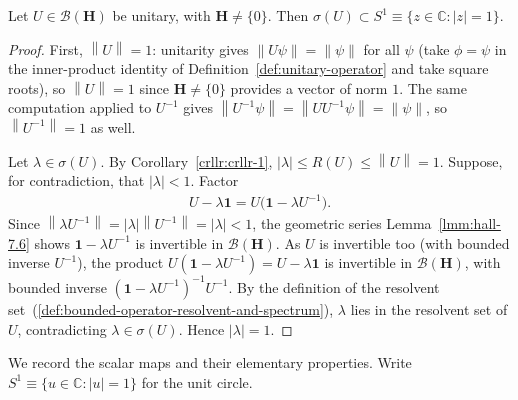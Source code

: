 \begin{lemma}
    \label{lmm:unitary-spectrum-circle}
    \leanok
    Let $U \in \mathcal{B}(\mathbf{H})$ be unitary, with $\mathbf{H} \ne \{0\}$. Then $\sigma(U) \subset S^1 \equiv \{ z \in \mathbb{C} : \lvert z \rvert = 1 \}$.
\end{lemma}
\begin{proof}
    \leanok
First, $\left\| U \right\| = 1$: unitarity gives $\left\| U\psi \right\| = \left\| \psi \right\|$ for all $\psi$ (take $\phi = \psi$ in the inner-product identity of Definition~\ref{def:unitary-operator} and take square roots), so $\left\| U \right\| = 1$ since $\mathbf{H} \ne \{0\}$ provides a vector of norm $1$. The same computation applied to $U^{-1}$ gives $\left\| U^{-1}\psi \right\| = \left\| U U^{-1}\psi \right\| = \left\| \psi \right\|$, so $\left\| U^{-1} \right\| = 1$ as well.

Let $\lambda \in \sigma(U)$. By Corollary~\ref{crllr:crllr-1}, $\lvert \lambda \rvert \le R(U) \le \left\| U \right\| = 1$. Suppose, for contradiction, that $\lvert \lambda \rvert < 1$. Factor
\begin{align}
    U - \lambda\mathbf{1} = U\big( \mathbf{1} - \lambda U^{-1} \big).
\end{align}
Since $\left\| \lambda U^{-1} \right\| = \lvert \lambda \rvert \left\| U^{-1} \right\| = \lvert \lambda \rvert < 1$, the geometric series Lemma~\ref{lmm:hall-7.6} shows $\mathbf{1} - \lambda U^{-1}$ is invertible in $\mathcal{B}(\mathbf{H})$. As $U$ is invertible too (with bounded inverse $U^{-1}$), the product $U(\mathbf{1}-\lambda U^{-1}) = U - \lambda\mathbf{1}$ is invertible in $\mathcal{B}(\mathbf{H})$, with bounded inverse $(\mathbf{1}-\lambda U^{-1})^{-1}U^{-1}$. By the definition of the resolvent set~(\ref{def:bounded-operator-resolvent-and-spectrum}), $\lambda$ lies in the resolvent set of $U$, contradicting $\lambda \in \sigma(U)$. Hence $\lvert \lambda \rvert = 1$.
\end{proof}

We record the scalar maps and their elementary properties. Write $S^1 \equiv \{ u \in \mathbb{C} : \lvert u \rvert = 1 \}$ for the unit circle.

